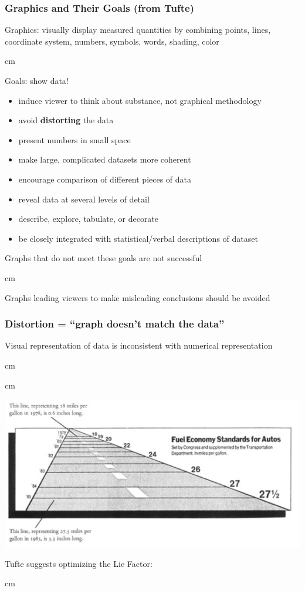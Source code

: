 \documentclass{beamer} %
\begin{document}
\begin{frame}\frametitle{Graphics and Their Goals (from Tufte)}
	\small
	
	Graphics:  visually display measured quantities by combining points, lines, coordinate system, numbers, symbols, words, shading, color
	
	 cm
	
	Goals:  show data!
	
	\begin{itemize}
		\item induce viewer to think about substance, not graphical methodology
		\item avoid \textbf{distorting} the data
		\item present numbers in small space
		\item make large, complicated datasets more coherent
		\item encourage comparison of different pieces of data
		\item reveal data at several levels of detail
		\item describe, explore, tabulate, or decorate
		\item be closely integrated with statistical/verbal descriptions of dataset
	\end{itemize}
	
	Graphs that do not meet these goals are not successful
	
	 cm
	
	Graphs leading viewers to make misleading conclusions should be avoided
	
\end{frame}



\begin{frame}\frametitle{Distortion = ``graph doesn't match the data''}
	\small
	
	Visual representation of data is inconsistent with numerical representation
	
	 cm

	 cm
	
	\includegraphics[width=0.71\linewidth]{fuel.jpg}
	
	Tufte suggests optimizing the Lie Factor:
	
	 cm
	
\end{frame}
\end{document}
